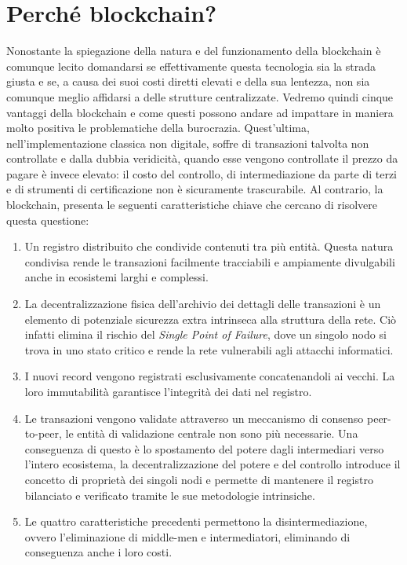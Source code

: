 \section{Perché blockchain?}

Nonostante la spiegazione della natura e del funzionamento della blockchain è comunque
lecito domandarsi se effettivamente questa tecnologia sia la strada giusta e se, a
causa dei suoi costi diretti elevati e della sua lentezza, non sia comunque meglio
affidarsi a delle strutture centralizzate.
Vedremo quindi cinque vantaggi della blockchain e come questi possono andare ad impattare
in maniera molto positiva le problematiche della burocrazia.
Quest'ultima, nell'implementazione classica non digitale, soffre di transazioni talvolta
non controllate e dalla dubbia veridicità, quando esse vengono controllate il prezzo
da pagare è invece elevato: il costo del controllo, di intermediazione da parte di terzi
e di strumenti di certificazione non è sicuramente trascurabile.
Al contrario, la blockchain, presenta le seguenti caratteristiche chiave che cercano di
risolvere questa questione:
\begin{enumerate}
    \item Un registro distribuito che condivide contenuti tra più entità.
    Questa natura condivisa rende le transazioni facilmente tracciabili e
    ampiamente divulgabili anche in ecosistemi larghi e complessi.
    \item La decentralizzazione fisica dell'archivio dei dettagli delle transazioni
    è un elemento di potenziale sicurezza extra intrinseca alla struttura della rete.
    Ciò infatti elimina il rischio del \emph{Single Point of Failure}, dove un singolo
    nodo si trova in uno stato critico e rende la rete vulnerabili agli attacchi informatici.
    \item I nuovi record vengono registrati esclusivamente concatenandoli ai vecchi.
    La loro immutabilità garantisce l'integrità dei dati nel registro.
    \item Le transazioni vengono validate attraverso un meccanismo di consenso peer-to-peer,
    le entità di validazione centrale non sono più necessarie.
    Una conseguenza di questo è lo spostamento del potere dagli intermediari verso
    l'intero ecosistema, la decentralizzazione del potere e del controllo introduce
    il concetto di proprietà dei singoli nodi e permette di mantenere il registro
    bilanciato e verificato tramite le sue metodologie intrinsiche.
    \item Le quattro caratteristiche precedenti permettono la disintermediazione,
    ovvero l'eliminazione di middle-men e intermediatori, eliminando di conseguenza
    anche i loro costi.
\end{enumerate}

